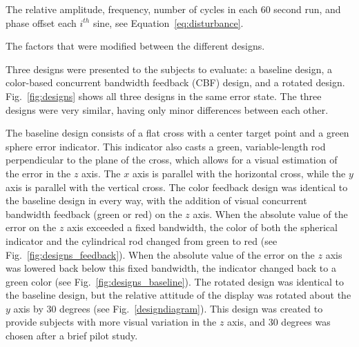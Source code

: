 \begin{table}[tb]
    \centering
    \caption{The relative amplitude, frequency, number of cycles in each 60 second run, and phase offset each $i^{th}$ sine, see Equation~\ref{eq:disturbance}.}
    \label{sine-table}
\end{table}

\begin{table}[tb]
    \centering
    \caption{The factors that were modified between the different designs.}
    \label{tab:designs}
\end{table}

Three designs were presented to the subjects to evaluate: a baseline design, a color-based concurrent bandwidth feedback (CBF) design, and a rotated design.
Fig.~\ref{fig:designs} shows all three designs in the same error state.
The three designs were very similar, having only minor differences between each other.

The baseline design consists of a flat cross with a center target point and a green sphere error indicator.
This indicator also casts a green, variable-length rod perpendicular to the plane of the cross, which allows for a visual estimation of the error in the $z$ axis.
The $x$ axis is parallel with the horizontal cross, while the $y$ axis is parallel with the vertical cross.
The color feedback design was identical to the baseline design in every way, with the addition of visual concurrent bandwidth feedback (green or red) on the $z$ axis.
When the absolute value of the error on the $z$ axis exceeded a fixed bandwidth, the color of both the spherical indicator and the cylindrical rod changed from green to red (see Fig.~\ref{fig:designs_feedback}).
When the absolute value of the error on the $z$ axis was lowered back below this fixed bandwidth, the indicator changed back to a green color (see Fig.~\ref{fig:designs_baseline}).
The rotated design was identical to the baseline design, but the relative attitude of the display was rotated about the $y$ axis by 30 degrees (see Fig.~\ref{designdiagram}).
This design was created to provide subjects with more visual variation in the $z$ axis, and 30 degrees was chosen after a brief pilot study.

